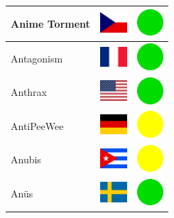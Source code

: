 \documentclass[12pt, a4paper, twoside]{report}
\begin{document}
\begin{center}
\begin{longtable}{|p{5cm}|p{2cm}|p{2cm}|}
 Anime Torment                                              & \includegraphics[width=1cm]{../4x3/cz} &   \includegraphics[width=1cm]{../likes/y} \\ \hline
 Antagonism                                                 & \includegraphics[width=1cm]{../4x3/fr} &   \includegraphics[width=1cm]{../likes/y} \\ \hline
 Anthrax                                                    & \includegraphics[width=1cm]{../4x3/us} &   \includegraphics[width=1cm]{../likes/y} \\ \hline
 AntiPeeWee                                                 & \includegraphics[width=1cm]{../4x3/de} &   \includegraphics[width=1cm]{../likes/m} \\ \hline
 Anubis                                                     & \includegraphics[width=1cm]{../4x3/cu} &   \includegraphics[width=1cm]{../likes/m} \\ \hline
 Anüs                                                       & \includegraphics[width=1cm]{../4x3/se} &   \includegraphics[width=1cm]{../likes/y} \\ \hline

\end{longtable}
\end{center}
\end{document}
